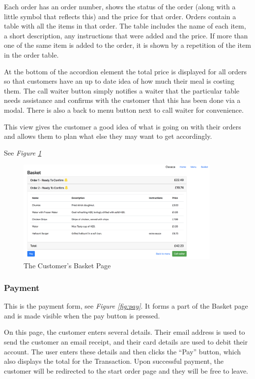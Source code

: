 \documentclass[12pt, twoside, a4paper]{report}
\begin{document}
Each order has an order number, shows the status of the order (along with a little symbol that reflects this) and the price for that order.
Orders contain a table with all the items in that order.
The table includes the name of each item, a short description, any instructions that were added and the price.
If more than one of the same item is added to the order, it is shown by a repetition of the item in the order table.

At the bottom of the accordion element the total price is displayed for all orders so that customers have an up to date idea of how much their meal is costing them.
The call waiter button simply notifies a waiter that the particular table needs assistance and confirms with the customer that this has been done via a modal.
There is also a back to menu button next to call waiter for convenience.

This view gives the customer a good idea of what is going on with their orders and allows them to plan what else they may want to get accordingly.

See \textit{Figure \ref{fig:basket}}

\begin{figure}[H]
  \centering
  \includegraphics[width=10cm]{basket.png}
  \caption{The Customer's Basket Page}
  \label{fig:basket}
\end{figure}

\subsubsection*{Payment}
This is the payment form, see \textit{Figure \ref{fig:pay}}. It forms a part of the Basket page and is made visible when the pay button is pressed.

On this page, the customer enters several details. Their email address is used to send the customer an email receipt, and their card details are used to debit their account.
The user enters these details and then clicks the “Pay” button, which also displays the total for the Transaction.
Upon successful payment, the customer will be redirected to the start order page and they will be free to leave.
\end{document}
